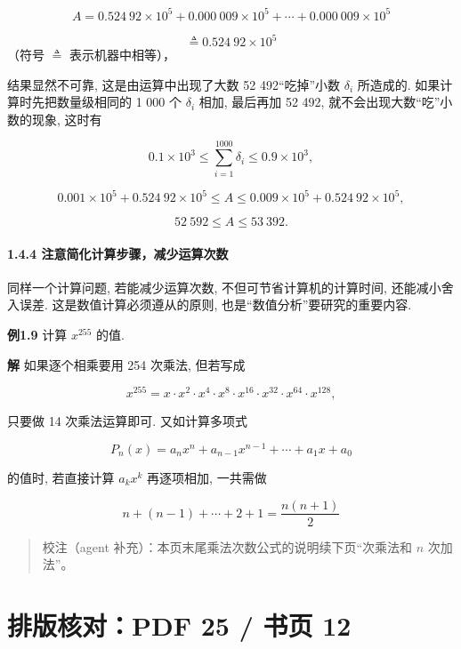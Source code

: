 \documentclass[
  10pt,
  a4paper,
]{article}
\begin{document}
\[
A = 0.524\ 92 \times 10^5 + 0.000\ 009 \times 10^5 + \cdots + 0.000\ 009 \times 10^5
\]

\[
\triangleq 0.524\ 92 \times 10^5
\] （符号 \(\triangleq\) 表示机器中相等），

结果显然不可靠, 这是由运算中出现了大数 52 492``吃掉''小数 \(\delta_i\)
所造成的. 如果计算时先把数量级相同的 1 000 个 \(\delta_i\) 相加,
最后再加 52 492, 就不会出现大数``吃''小数的现象, 这时有

\[
0.1 \times 10^3 \leqslant \sum_{i=1}^{1000} \delta_i \leqslant 0.9 \times 10^3,
\]

\[
0.001 \times 10^5 + 0.524\ 92 \times 10^5 \leqslant A \leqslant 0.009 \times 10^5 + 0.524\ 92 \times 10^5,
\]

\[
52\ 592 \leqslant A \leqslant 53\ 392.
\]

\paragraph{1.4.4
注意简化计算步骤，减少运算次数}\label{ux6ce8ux610fux7b80ux5316ux8ba1ux7b97ux6b65ux9aa4ux51cfux5c11ux8fd0ux7b97ux6b21ux6570}

同样一个计算问题, 若能减少运算次数, 不但可节省计算机的计算时间,
还能减小舍入误差. 这是数值计算必须遵从的原则,
也是``数值分析''要研究的重要内容.

\textbf{例1.9} 计算 \(x^{255}\) 的值.

\textbf{解} 如果逐个相乘要用 254 次乘法, 但若写成

\[
x^{255} = x \cdot x^2 \cdot x^4 \cdot x^8 \cdot x^{16} \cdot x^{32} \cdot x^{64} \cdot x^{128},
\]

只要做 14 次乘法运算即可. 又如计算多项式

\[
P_n(x) = a_n x^n + a_{n-1} x^{n-1} + \cdots + a_1 x + a_0
\]

的值时, 若直接计算 \(a_k x^k\) 再逐项相加, 一共需做

\[
n + (n-1) + \cdots + 2 + 1 = \frac{n(n+1)}{2}
\]

\begin{quote}
校注（agent 补充）：本页末尾乘法次数公式的说明续下页``次乘法和 \(n\)
次加法''。
\end{quote}

\newpage

\section{排版核对：PDF 25 / 书页
12}\label{ux6392ux7248ux6838ux5bf9pdf-25-ux4e66ux9875-12}
\end{document}

